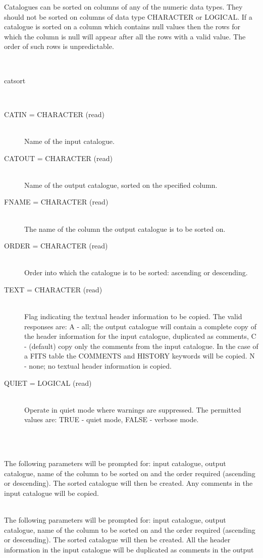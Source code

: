 \documentclass[twoside,11pt]{article}
\renewcommand{\_}{\texttt{\symbol{95}}}
\newlength{\sstexampleslength}
\newcommand{\sstusage}[1]{\item[Usage:] \mbox{}
\\[1.3ex]{\raggedright \ssttt #1}}
\newcommand{\sstparameters}[1]{
   \item[Parameters:] \mbox{} \\
   \vspace{-3.5ex}
   \begin{description}
      #1
   \end{description}
}
\newcommand{\sstexamples}[1]{
   \item[Examples:] \mbox{} \\
   \vspace{-3.5ex}
   \begin{description}
      #1
   \end{description}
}
\newcommand{\sstsubsection}[1]{ \item[{#1}] \mbox{} \\}
\newcommand{\sstexamplesubsection}[2]{\sloppy
\item[\parbox{\sstexampleslength}{\ssttt #1}] \mbox{} \vspace{1.0ex}
\\ #2 }
\newcommand{\sstusage}[1]{\item[Usage:]
      \begin{description}
         {\ssttt #1}
      \end{description}
      \\
   }
\newcommand{\sstparameters}[1]{
      \item[Parameters:] \\
      \begin{description}
         #1
      \end{description}
      \\
   }
\newcommand{\sstexamples}[1]{
      \item[Examples:] \\
      \begin{description}
         #1
      \end{description}
      \\
   }
\newcommand{\sstsubsection}[1]{\item[{#1}]}
\newcommand{\sstexamplesubsection}[2]{\item[{\ssttt #1}] #2}
\begin{document}
\begin{htmlonly}
{{      Catalogues can be sorted on columns of any of the numeric data
      types.  They should not be sorted on columns of data type CHARACTER
      or LOGICAL.  If a catalogue is sorted on a column which contains null
      values then the rows for which the column is null will appear after
      all the rows with a valid value. The order of such rows is
      unpredictable.
   }
   \sstusage{
      catsort
   }
   \sstparameters{
      \sstsubsection{
         CATIN  =  CHARACTER (read)
      }{
         Name of the input catalogue.
      }
      \sstsubsection{
         CATOUT  =  CHARACTER (read)
      }{
         Name of the output catalogue, sorted on the specified column.
      }
      \sstsubsection{
         FNAME  =  CHARACTER (read)
      }{
         The name of the column the output catalogue is to be sorted on.
      }
      \sstsubsection{
         ORDER  =  CHARACTER (read)
      }{
         Order into which the catalogue is to be sorted: ascending or
         descending.
      }
      \sstsubsection{
         TEXT  =  CHARACTER (read)
      }{
         Flag indicating the textual header information to be copied.
         The valid responses are:
         A - all; the output catalogue will contain a complete copy
             of the header information for the input catalogue,
             duplicated as comments,
         C - (default) copy only the comments from the input catalogue.
             In the case of a FITS table the COMMENTS and HISTORY
             keywords will be copied.
         N - none; no textual header information is copied.
      }
      \sstsubsection{
         QUIET  =  LOGICAL (read)
      }{
         Operate in quiet mode where warnings are suppressed.  The
         permitted values are:
         TRUE  - quiet mode,
         FALSE - verbose mode.
      }
   }
   \sstexamples{
      \sstexamplesubsection{
         catsort
      }{
         The following parameters will be prompted for: input catalogue,
         output catalogue, name of the column to be sorted on and the
         order required (ascending or descending).  The sorted catalogue
         will then be created.  Any comments in the input catalogue will
         be copied.
      }
      \sstexamplesubsection{
         catsort  text=all
      }{
         The following parameters will be prompted for: input catalogue,
         output catalogue, name of the column to be sorted on and the
         order required (ascending or descending).  The sorted catalogue
         will then be created.  All the header information in the input
         catalogue will be duplicated as comments in the output
}}}
\end{htmlonly}
\end{document}

